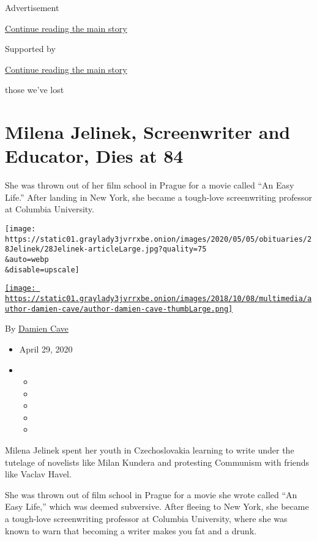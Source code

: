 Advertisement

\protect\hyperlink{after-top}{Continue reading the main story}

Supported by

\protect\hyperlink{after-sponsor}{Continue reading the main story}

those we've lost

\hypertarget{milena-jelinek-screenwriter-and-educator-dies-at-84}{%
\section{Milena Jelinek, Screenwriter and Educator, Dies at
84}\label{milena-jelinek-screenwriter-and-educator-dies-at-84}}

She was thrown out of her film school in Prague for a movie called ``An
Easy Life.'' After landing in New York, she became a tough-love
screenwriting professor at Columbia University.

\texttt{[image: https://static01.graylady3jvrrxbe.onion/images/2020/05/05/obituaries/28Jelinek/28Jelinek-articleLarge.jpg?quality=75\\\&auto=webp\\\&disable=upscale]}

\href{https://www.nytimes3xbfgragh.onion/by/damien-cave}{\texttt{[image: https://static01.graylady3jvrrxbe.onion/images/2018/10/08/multimedia/author-damien-cave/author-damien-cave-thumbLarge.png]}}

By \href{https://www.nytimes3xbfgragh.onion/by/damien-cave}{Damien Cave}

\begin{itemize}
\item
  April 29, 2020
\item
  \begin{itemize}
  \item
  \item
  \item
  \item
  \item
  \end{itemize}
\end{itemize}

Milena Jelinek spent her youth in Czechoslovakia learning to write under
the tutelage of novelists like Milan Kundera and protesting Communism
with friends like Vaclav Havel.

She was thrown out of film school in Prague for a movie she wrote called
``An Easy Life,'' which was deemed subversive. After fleeing to New
York, she became a tough-love screenwriting professor at Columbia
University, where she was known to warn that becoming a writer makes you
fat and a drunk.

